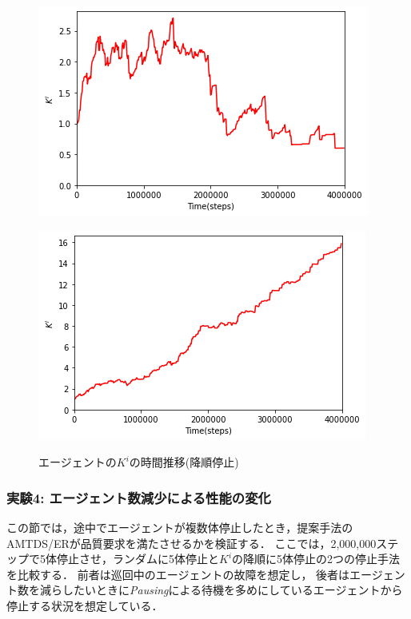 \documentclass[12pt,a4j,twoside]{jarticle}
\begin{document}
  \begin{figure}
    \begin{minipage}{0.48\hsize}
      \centering
      \includegraphics[width=0.99\hsize]{figures/CorrectionTransition_DescendingStop_2.png}
      \label{subfig:transition_descending_2}
    \end{minipage}
    \hfill
    \begin{minipage}{0.48\hsize}
      \centering
      \includegraphics[width=0.99\hsize]{figures/CorrectionTransition_DescendingStop_10.png}
      \label{subfig:transition_descending_10}
    \end{minipage}
    \caption{エージェントの$K^i$の時間推移(降順停止)}
    \label{fig:transition_descendingStop}
  \end{figure}
  

  \subsubsection{実験4: エージェント数減少による性能の変化}\label{ex:ER4}
  この節では，途中でエージェントが複数体停止したとき，提案手法のAMTDS/ERが品質要求を満たさせるかを検証する．
  ここでは，2,000,000ステップで5体停止させ，ランダムに5体停止と$K^i$の降順に5体停止の2つの停止手法を比較する．
  前者は巡回中のエージェントの故障を想定し，
  後者はエージェント数を減らしたいときに{\em Pausing}による待機を多めにしているエージェントから停止する状況を想定している．
  \par
\end{document}
